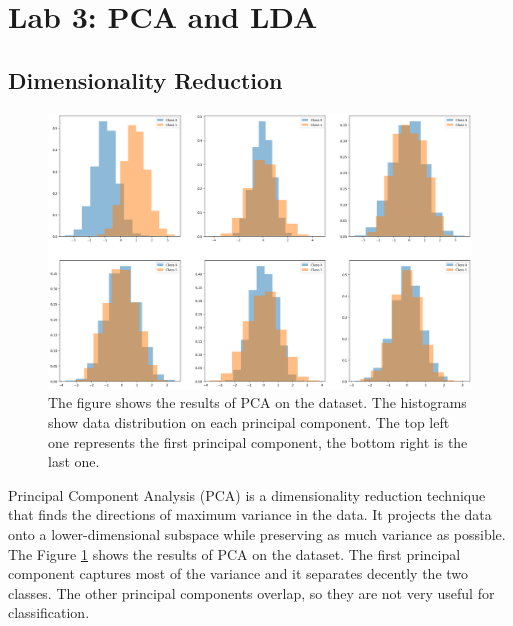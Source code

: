 \documentclass{article}
\begin{document}
\section{Lab 3: PCA and LDA}
\label{sec:pca_lda}

\subsection{Dimensionality Reduction}

\begin{figure}[ht]
    \centering
    \includegraphics[width=\textwidth]{images/dataset_pca.png}
    \caption{The figure shows the results of PCA on the dataset. The histograms show data distribution on each principal component. The top left one represents the first principal component, the bottom right is the last one. }
    \label{fig:dataset_pca}
\end{figure}

Principal Component Analysis (PCA) is a dimensionality reduction technique that finds the directions of maximum variance in the data. It projects the data onto a lower-dimensional subspace while preserving as much variance as possible.
The Figure \ref{fig:dataset_pca} shows the results of PCA on the dataset. The first principal component captures most of the variance and it separates decently the two classes. The other principal components overlap, so they are not very useful for classification.
\end{document}
